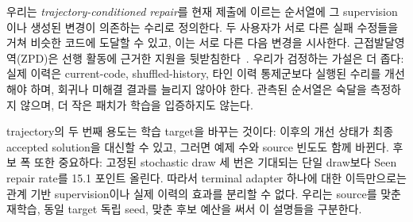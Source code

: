 \documentclass[10pt,conference]{IEEEtran}
\begin{document}
우리는 \emph{trajectory-conditioned repair}를 현재 제출에 이르는 순서열에 그 supervision이나 생성된 변경이 의존하는 수리로 정의한다. 두 사용자가 서로 다른 실패 수정들을 거쳐 비슷한 코드에 도달할 수 있고, 이는 서로 다른 다음 변경을 시사한다. 근접발달영역(ZPD)은 선행 활동에 근거한 지원을 뒷받침한다~\cite{cole1978mind,murray2002toward,chounta2017grey,schulze2024beyond}. 우리가 검정하는 가설은 더 좁다: 실제 이력은 current-code, shuffled-history, 타인 이력 통제군보다 실행된 수리를 개선해야 하며, 회귀나 미해결 결과를 늘리지 않아야 한다. 관측된 순서열은 숙달을 측정하지 않으며, 더 작은 패치가 학습을 입증하지도 않는다.

trajectory의 두 번째 용도는 학습 target을 바꾸는 것이다: 이후의 개선 상태가 최종 accepted solution을 대신할 수 있고, 그러면 예제 수와 source 빈도도 함께 바뀐다. 후보 폭 또한 중요하다: 고정된 stochastic draw 세 번은 기대되는 단일 draw보다 Seen repair rate를 15.1 포인트 올린다. 따라서 terminal adapter 하나에 대한 이득만으로는 관계 기반 supervision이나 실제 이력의 효과를 분리할 수 없다. 우리는 source를 맞춘 재학습, 동일 target 독립 seed, 맞춘 후보 예산을 써서 이 설명들을 구분한다.
\end{document}
